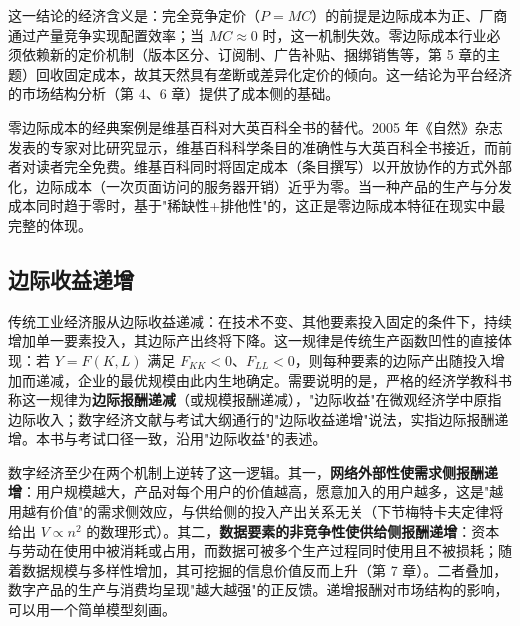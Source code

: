 这一结论的经济含义是：完全竞争定价（$P=MC$）的前提是边际成本为正、厂商通过产量竞争实现配置效率；当 $MC\approx 0$ 时，这一机制失效。零边际成本行业必须依赖新的定价机制（版本区分、订阅制、广告补贴、捆绑销售等，第 5 章的主题）回收固定成本，故其天然具有垄断或差异化定价的倾向。这一结论为平台经济的市场结构分析（第 4、6 章）提供了成本侧的基础。

零边际成本的经典案例是维基百科对大英百科全书的替代。2005 年《自然》杂志发表的专家对比研究显示，维基百科科学条目的准确性与大英百科全书接近，而前者对读者完全免费。维基百科同时将固定成本（条目撰写）以开放协作的方式外部化，边际成本（一次页面访问的服务器开销）近乎为零。当一种产品的生产与分发成本同时趋于零时，基于"稀缺性+排他性"的，这正是零边际成本特征在现实中最完整的体现。

\subsection{边际收益递增}

传统工业经济服从边际收益递减：在技术不变、其他要素投入固定的条件下，持续增加单一要素投入，其边际产出终将下降。这一规律是传统生产函数凹性的直接体现：若 $Y=F(K,L)$ 满足 $F_{KK}<0$、$F_{LL}<0$，则每种要素的边际产出随投入增加而递减，企业的最优规模由此内生地确定。需要说明的是，严格的经济学教科书称这一规律为\textbf{边际报酬递减}（或规模报酬递减），"边际收益"在微观经济学中原指边际收入；数字经济文献与考试大纲通行的"边际收益递增"说法，实指边际报酬递增。本书与考试口径一致，沿用"边际收益"的表述。

数字经济至少在两个机制上逆转了这一逻辑。其一，\textbf{网络外部性使需求侧报酬递增}：用户规模越大，产品对每个用户的价值越高，愿意加入的用户越多，这是"越用越有价值"的需求侧效应，与供给侧的投入产出关系无关（下节梅特卡夫定律将给出 $V\propto n^2$ 的数理形式）。其二，\textbf{数据要素的非竞争性使供给侧报酬递增}：资本与劳动在使用中被消耗或占用，而数据可被多个生产过程同时使用且不被损耗；随着数据规模与多样性增加，其可挖掘的信息价值反而上升（第 7 章）。二者叠加，数字产品的生产与消费均呈现"越大越强"的正反馈。递增报酬对市场结构的影响，可以用一个简单模型刻画。

